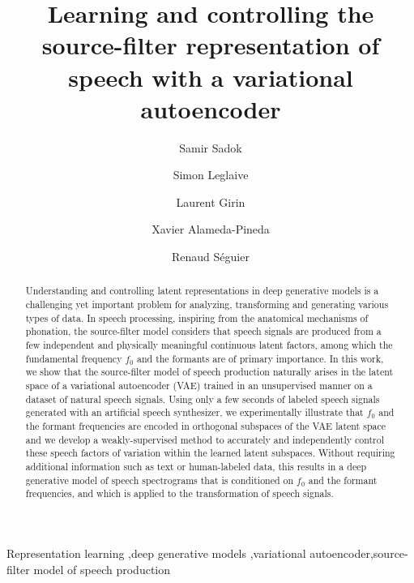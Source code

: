 \documentclass[review]{elsarticle}
\begin{document}
\begin{frontmatter}

\title{Learning and controlling the source-filter representation of speech with a variational autoencoder}

\author[1]{Samir Sadok}
\author[1]{Simon Leglaive}
\author[2]{Laurent Girin}
\author[3]{Xavier Alameda-Pineda}
\author[1]{Renaud S\'eguier}
\address[1]{CentraleSupélec, IETR UMR CNRS 6164, France}
\address[2]{Univ.~Grenoble Alpes, CNRS, Grenoble-INP, GIPSA-lab, France}
\address[3]{Inria, Univ.~Grenoble Alpes, CNRS, LJK, France}
\begin{abstract}
Understanding and controlling latent representations in deep generative models is a challenging yet important problem for analyzing, transforming and generating various types of data. In speech processing, inspiring from the anatomical mechanisms of phonation, the source-filter model considers that speech signals are produced from a few independent and physically meaningful continuous latent factors, among which the fundamental frequency $f_0$ and the formants are of primary importance. In this work, we show that the source-filter model of speech production naturally arises in the latent space of a variational autoencoder (VAE) trained in an unsupervised manner on a dataset of natural speech signals. Using only a few seconds of labeled speech signals generated with an artificial speech synthesizer, we experimentally illustrate that $f_0$ and the formant frequencies are encoded in orthogonal subspaces of the VAE latent space and we develop a weakly-supervised method to accurately and independently control these speech factors of variation within the learned latent subspaces. Without requiring additional information such as text or human-labeled data, this results in a deep generative model of speech spectrograms that is conditioned on $f_0$ and the formant frequencies, and which is applied to the transformation of speech signals.
\end{abstract}

\begin{keyword}
Representation learning \sep deep generative models \sep variational autoencoder\sep source-filter model of speech production
\end{keyword}

\end{frontmatter}
\end{document}
